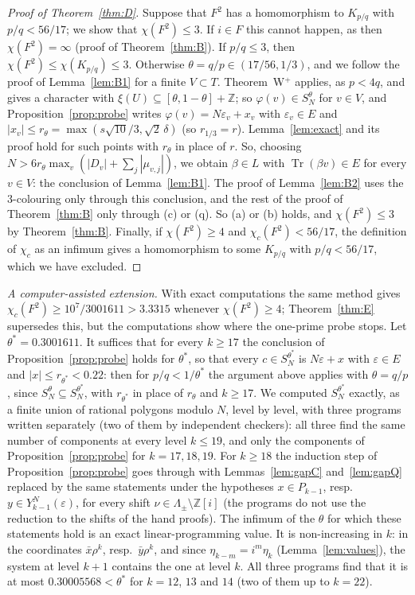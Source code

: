 \documentclass[11pt,a4paper]{amsart}
\theoremstyle{remark}
\newcommand{\Z}{\mathbb{Z}}
\newcommand{\Tr}{\operatorname{Tr}}
\begin{document}
\begin{proof}[Proof of Theorem~\ref{thm:D}]
Suppose that $F^2$ has a homomorphism to $K_{p/q}$ with $p/q<56/17$; we show that $\chi(F^2)\le3$. If $i\in F$ this
cannot happen, as then $\chi(F^2)=\infty$ (proof of Theorem~\ref{thm:B}). If $p/q\le3$, then $\chi(F^2)\le
\chi(K_{p/q})\le3$. Otherwise $\theta=q/p\in(17/56,1/3)$, and we follow the proof of Lemma~\ref{lem:B1} for a finite
$V\subset T$. Theorem~W$^+$ applies, as $p<4q$, and gives a character with $\xi(U)\subseteq[\theta,1-\theta]+\Z$; so
$\varphi(v)\in S_N^\theta$ for $v\in V$, and Proposition~\ref{prop:probe} writes $\varphi(v)=N\varepsilon_v+x_v$ with
$\varepsilon_v\in E$ and $|x_v|\le r_\theta=\max(s\sqrt{10}/3,\sqrt2\,\delta)$ (so $r_{1/3}=r$).
Lemma~\ref{lem:exact} and its proof hold for such points with $r_\theta$ in place of $r$. So, choosing
$N>6r_\theta\max_v(|D_v|+\sum_j|\mu_{v,j}|)$, we obtain $\beta\in L$ with
$\Tr(\beta v)\in E$ for every $v\in V$: the conclusion of Lemma~\ref{lem:B1}. The proof of Lemma~\ref{lem:B2} uses
the $3$-colouring only through this conclusion, and the rest of the proof of Theorem~\ref{thm:B} only through (c) or
(q). So (a) or (b) holds, and $\chi(F^2)\le3$ by Theorem~\ref{thm:B}. Finally, if $\chi(F^2)\ge4$ and
$\chi_c(F^2)<56/17$, the definition of $\chi_c$ as an infimum gives a homomorphism to some $K_{p/q}$ with
$p/q<56/17$, which we have excluded.
\end{proof}

\emph{A computer-assisted extension.} With exact computations the same method gives
$\chi_c(F^2)\ge10^7/3001611>3.3315$ whenever $\chi(F^2)\ge4$; Theorem~\ref{thm:E} supersedes this, but the
computations show where the one-prime probe stops. Let $\theta^*=0.3001611$. It suffices that for every $k\ge17$ the
conclusion of Proposition~\ref{prop:probe} holds for $\theta^*$, so that every $c\in S_N^{\theta^*}$ is
$N\varepsilon+x$ with $\varepsilon\in E$ and $|x|\le r_{\theta^*}<0.22$: then for $p/q<1/\theta^*$ the argument above
applies with $\theta=q/p$, since $S_N^\theta\subseteq S_N^{\theta^*}$, with $r_{\theta^*}$ in place of $r_\theta$ and
$k\ge17$. We computed
$S_N^{\theta^*}$ exactly, as a finite union of rational polygons modulo $N$, level by level, with three programs
written separately (two of them by independent checkers): all three find the same number of components at every level $k\le19$,
and only the components of Proposition~\ref{prop:probe} for $k=17,18,19$. For $k\ge18$ the induction step of
Proposition~\ref{prop:probe} goes through with Lemmas~\ref{lem:gapC} and~\ref{lem:gapQ} replaced by the same
statements under the hypotheses $x\in P_{k-1}$, resp.\ $y\in Y^N_{k-1}(\varepsilon)$, for every shift
$\nu\in\Lambda_\pm\setminus\Z[i]$ (the programs do not use the reduction to the shifts of the hand proofs). The
infimum of the $\theta$ for which these statements hold is an exact linear-programming value. It is non-increasing in
$k$: in the coordinates $\bar x\rho^k$, resp.\ $\bar y\rho^k$, and since $\eta_{k-m}=i^m\eta_k$
(Lemma~\ref{lem:values}), the system at level $k+1$ contains the one at level $k$. All three programs find that it is
at most $0.30005568<\theta^*$ for $k=12$, $13$ and $14$ (two of them up to $k=22$).
\end{document}
